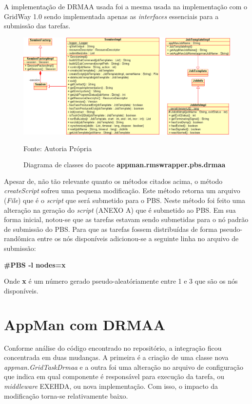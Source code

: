 A implementação de DRMAA usada foi a mesma usada na implementação com o GridWay 1.0 \cite{Herrera2007} sendo implementada apenas as \emph{interfaces} essenciais para a submissão das tarefas. 

\begin{figure}[htb]
\begin{center}
\includegraphics[scale=0.5]{./img/drmaaUML2.eps}
\caption{Diagrama de classes do pacote \textbf{appman.rmswrapper.pbs.drmaa}}
\label{fig:UML_DRMAA}
Fonte: Autoria Própria
\end{center}
\end{figure}

Apesar de, não tão relevante quanto os métodos citados acima, o método \emph{createScript} sofreu uma pequena modificação. Este método retorna um arquivo (\emph{File}) que é o \emph{script} que será submetido para o PBS. Neste método foi feito uma alteração na geração do \emph{script} (ANEXO A) que é submetido ao PBS. Em sua forma inicial, notou-se que as tarefas estavam sendo submetidas para o nó padrão de submissão do PBS. Para que as tarefas fossem distribuídas de forma pseudo-randômica entre os nós disponíveis adicionou-se a seguinte linha no arquivo de submissão:

\textbf{\#PBS -l nodes=x}

Onde \textbf{x} é um número gerado pseudo-aleatóriamente entre 1 e 3 que são os nós disponíveis.

\section{AppMan com DRMAA}

Conforme análise do código encontrado no repositório, a integração ficou concentrada em duas mudanças. A primeira é a criação de uma classe nova \emph{appman.GridTaskDrmaa} e a outra foi uma alteração no arquivo de configuração que indica em qual componente é responsável para execução da tarefa, ou \emph{middleware} EXEHDA, ou nova implementação. Com isso, o impacto da modificação torna-se relativamente baixo. 

